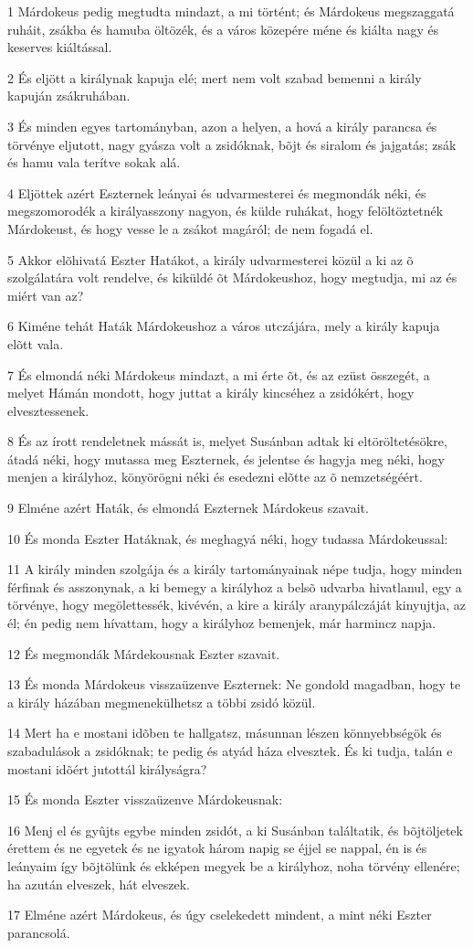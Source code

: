 \par 1 Márdokeus pedig megtudta mindazt, a mi történt; és Márdokeus megszaggatá ruháit, zsákba és hamuba öltözék, és a város közepére méne és kiálta nagy és keserves kiáltással.
\par 2 És eljött a királynak kapuja elé; mert nem volt szabad bemenni a király kapuján zsákruhában.
\par 3 És minden egyes tartományban, azon a helyen, a hová a király parancsa és törvénye eljutott, nagy gyásza volt a zsidóknak, bõjt és siralom és jajgatás; zsák és hamu vala terítve sokak alá.
\par 4 Eljöttek azért Eszternek leányai és udvarmesterei és megmondák néki, és megszomorodék a királyasszony nagyon, és külde ruhákat, hogy felöltöztetnék Márdokeust, és hogy vesse le a zsákot magáról; de nem fogadá el.
\par 5 Akkor elõhivatá Eszter Hatákot, a király udvarmesterei közül a ki az õ szolgálatára volt rendelve, és kiküldé õt Márdokeushoz, hogy megtudja, mi az és miért van az?
\par 6 Kiméne tehát Haták Márdokeushoz a város utczájára, mely a király kapuja elõtt vala.
\par 7 És elmondá néki Márdokeus mindazt, a mi érte õt, és az ezüst összegét, a melyet Hámán mondott, hogy juttat a király kincséhez a zsidókért, hogy elvesztessenek.
\par 8 És az írott rendeletnek mássát is, melyet Susánban adtak ki eltöröltetésökre, átadá néki, hogy mutassa meg Eszternek, és jelentse és hagyja meg néki, hogy menjen a királyhoz, könyörögni néki és esedezni elõtte az õ nemzetségéért.
\par 9 Elméne azért Haták, és elmondá Eszternek Márdokeus szavait.
\par 10 És monda Eszter Hatáknak, és meghagyá néki, hogy tudassa Márdokeussal:
\par 11 A király minden szolgája és a király tartományainak népe tudja, hogy minden férfinak és asszonynak, a ki bemegy a királyhoz a belsõ udvarba hivatlanul, egy a törvénye, hogy megölettessék, kivévén, a kire a király aranypálczáját kinyujtja, az él; én pedig nem hívattam, hogy a királyhoz bemenjek, már harmincz napja.
\par 12 És megmondák Márdekousnak Eszter szavait.
\par 13 És monda Márdokeus visszaüzenve Eszternek: Ne gondold magadban, hogy te a király házában megmenekülhetsz a többi zsidó közül.
\par 14 Mert ha e mostani idõben te hallgatsz, másunnan lészen könnyebbségök és szabadulások a zsidóknak; te pedig és atyád háza elvesztek. És ki tudja, talán e mostani idõért jutottál királyságra?
\par 15 És monda Eszter visszaüzenve Márdokeusnak:
\par 16 Menj el és gyûjts egybe minden zsidót, a ki Susánban találtatik, és bõjtöljetek érettem és ne egyetek és ne igyatok három napig se éjjel se nappal, én is és leányaim így bõjtölünk és ekképen megyek be a királyhoz, noha törvény ellenére; ha azután elveszek, hát elveszek.
\par 17 Elméne azért Márdokeus, és úgy cselekedett mindent, a mint néki Eszter parancsolá.

